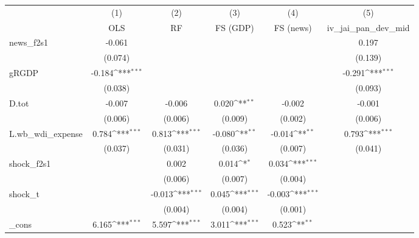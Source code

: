 {
\def\sym#1{\ifmmode^{#1}\else\(^{#1}\)\fi}
\begin{tabular}{l*{5}{c}}
\toprule
            &\multicolumn{1}{c}{(1)}&\multicolumn{1}{c}{(2)}&\multicolumn{1}{c}{(3)}&\multicolumn{1}{c}{(4)}&\multicolumn{1}{c}{(5)}\\
            &\multicolumn{1}{c}{OLS}&\multicolumn{1}{c}{RF}&\multicolumn{1}{c}{FS (GDP)}&\multicolumn{1}{c}{FS (news)}&\multicolumn{1}{c}{iv\_jai\_pan\_dev\_mid}\\
\midrule
news\_f2s1   &      -0.061         &                     &                     &                     &       0.197         \\
            &     (0.074)         &                     &                     &                     &     (0.139)         \\
\addlinespace
gRGDP       &      -0.184\sym{***}&                     &                     &                     &      -0.291\sym{***}\\
            &     (0.038)         &                     &                     &                     &     (0.093)         \\
\addlinespace
D.tot       &      -0.007         &      -0.006         &       0.020\sym{**} &      -0.002         &      -0.001         \\
            &     (0.006)         &     (0.006)         &     (0.009)         &     (0.002)         &     (0.006)         \\
\addlinespace
L.wb\_wdi\_expense&       0.784\sym{***}&       0.813\sym{***}&      -0.080\sym{**} &      -0.014\sym{**} &       0.793\sym{***}\\
            &     (0.037)         &     (0.031)         &     (0.036)         &     (0.007)         &     (0.041)         \\
\addlinespace
shock\_f2s1  &                     &       0.002         &       0.014\sym{*}  &       0.034\sym{***}&                     \\
            &                     &     (0.006)         &     (0.007)         &     (0.004)         &                     \\
\addlinespace
shock\_t     &                     &      -0.013\sym{***}&       0.045\sym{***}&      -0.003\sym{***}&                     \\
            &                     &     (0.004)         &     (0.004)         &     (0.001)         &                     \\
\addlinespace
\_cons      &       6.165\sym{***}&       5.597\sym{***}&       3.011\sym{***}&       0.523\sym{**} &                     \\

\end{tabular}}
